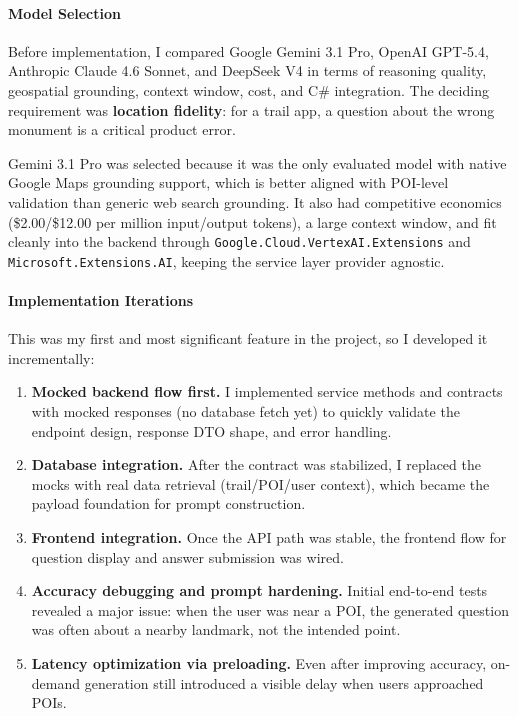 \documentclass[11pt,a4paper]{article}
\begin{document}
\paragraph{Model Selection}
Before implementation, I compared Google Gemini 3.1 Pro, OpenAI GPT-5.4, Anthropic Claude 4.6 Sonnet, and DeepSeek V4 in terms of reasoning quality, geospatial grounding, context window, cost, and C\# integration.
The deciding requirement was \textbf{location fidelity}: for a trail app, a question about the wrong monument is a critical product error.

Gemini 3.1 Pro was selected because it was the only evaluated model with native Google Maps grounding support, which is better aligned with POI-level validation than generic web search grounding.
It also had competitive economics (\$2.00/\$12.00 per million input/output tokens), a large context window, and fit cleanly into the backend through \texttt{Google.Cloud.VertexAI.Extensions} and \texttt{Microsoft.Extensions.AI}, keeping the service layer provider agnostic.

\paragraph{Implementation Iterations}
This was my first and most significant feature in the project, so I developed it incrementally:

\begin{enumerate}
    \item \textbf{Mocked backend flow first.} I implemented service methods and contracts with mocked responses (no database fetch yet) to quickly validate the endpoint design, response DTO shape, and error handling.

    \item \textbf{Database integration.} After the contract was stabilized, I replaced the mocks with real data retrieval (trail/POI/user context), which became the payload foundation for prompt construction.

    \item \textbf{Frontend integration.} Once the API path was stable, the frontend flow for question display and answer submission was wired.

    \item \textbf{Accuracy debugging and prompt hardening.} Initial end-to-end tests revealed a major issue: when the user was near a POI, the generated question was often about a nearby landmark, not the intended point.

    \item \textbf{Latency optimization via preloading.} Even after improving accuracy, on-demand generation still introduced a visible delay when users approached POIs.
\end{enumerate}
\end{document}

